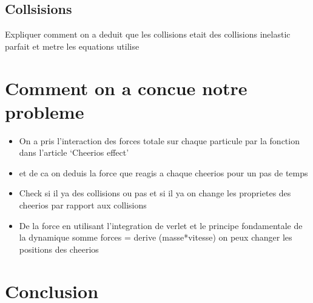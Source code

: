 \documentclass[a4paper, 11pt, oneside]{article} %
\begin{document}
    \subsection{Collsisions}
    Expliquer comment on a deduit que les collisions etait des collisions inelastic parfait et metre les equations utilise

\section{Comment on a concue notre probleme}
    \begin{itemize}
        \item On a pris l'interaction des forces totale sur chaque particule par la fonction dans l'article `Cheerios effect'
        \item et de ca on deduis la force que reagis a chaque cheerios pour un pas de temps 
        \item Check si il ya des collisions ou pas et si il ya on change les proprietes des cheerios par rapport aux collisions
        \item De la force en utilisant l'integration de verlet et le principe fondamentale de la dynamique somme forces = derive (masse*vitesse) on peux changer les positions des cheerios
    \end{itemize}
\section*{Conclusion}

\newpage
\thispagestyle{empty}
\nocite{*}
\printbibliography[title = Bibliographie]
\end{document}
